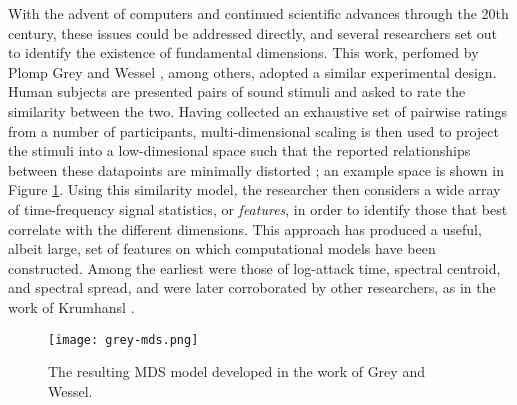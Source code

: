 With the advent of computers and continued scientific advances through the 20th century, these issues could be addressed directly, and several researchers set out to identify the existence of fundamental dimensions.
This work, perfomed by Plomp \cite{Plomp1976} Grey and Wessel \cite{Grey1979}, among others, adopted a similar experimental design.
Human subjects are presented pairs of sound stimuli and asked to rate the similarity between the two.
Having collected an exhaustive set of pairwise ratings from a number of participants, multi-dimensional scaling is then used to project the stimuli into a low-dimesional space such that the reported relationships between these datapoints are minimally distorted \cite{Grey1979}; an example space is shown in Figure \ref{fig:grey_mds}.
Using this similarity model, the researcher then considers a wide array of time-frequency signal statistics, or \emph{features}, in order to identify those that best correlate with the different dimensions.
This approach has produced a useful, albeit large, set of features on which computational models have been constructed.
Among the earliest were those of log-attack time, spectral centroid, and spectral spread, and were later corroborated by other researchers, as in the work of Krumhansl \cite{Krumhansl}.

\begin{figure}[t]
\centering
\texttt{[image: grey-mds.png]}
\caption{The resulting MDS model developed in the work of Grey and Wessel.}
\label{fig:grey_mds}
\end{figure}


